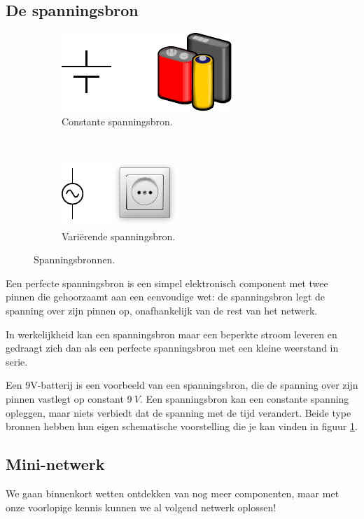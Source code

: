 \documentclass{article}
\begin{document}
		\subsection{De spanningsbron}

			\begin{figure}[hbtp]
				\centering
				\begin{subfigure}[b]{0.4\linewidth}
					\centering
					\includegraphics{vc}
					\caption{Constante spanningsbron.}
				\end{subfigure}
				~
				\begin{subfigure}[b]{0.4\linewidth}
					\centering
					\includegraphics{vt}
					\caption{Vari\"erende spanningsbron.}
				\end{subfigure}
				\caption{Spanningsbronnen.}
				\label{fig:vbron}
			\end{figure}
			 Een perfecte spanningsbron is een simpel elektronisch component met twee pinnen die gehoorzaamt aan een eenvoudige wet: de spanningsbron legt de spanning over zijn pinnen op, onafhankelijk van de rest van het netwerk.
			 
			 In werkelijkheid kan een spanningsbron maar een beperkte stroom leveren en gedraagt zich dan als een perfecte spanningsbron met een kleine weerstand in serie. 
			 
			 Een 9V-batterij is een voorbeeld van een spanningsbron, die de spanning over zijn pinnen vastlegt op constant $9~V$. Een spanningsbron kan een constante spanning opleggen, maar niets verbiedt dat de spanning met de tijd verandert. Beide type bronnen hebben hun eigen schematische voorstelling die je kan vinden in figuur \ref{fig:vbron}.

		\subsection{Mini-netwerk}
			We gaan binnenkort wetten ontdekken van nog meer componenten, maar met onze voorlopige kennis kunnen we al volgend netwerk oplossen!
\end{document}
